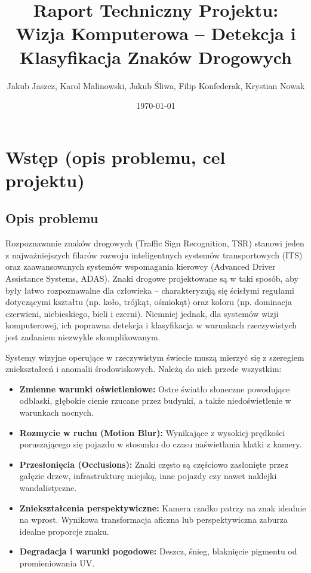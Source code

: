 \documentclass[12pt,a4paper]{article}
\title{\Huge Raport Techniczny Projektu:\\ \Large Wizja Komputerowa -- Detekcja i Klasyfikacja Znaków Drogowych}
\author{Jakub Jaszcz, Karol Malinowski, Jakub Śliwa, Filip Konfederak, Krystian Nowak}
\date{\today}
\begin{document}
\maketitle
\thispagestyle{empty}
\newpage

\tableofcontents
\newpage

\section{Wstęp (opis problemu, cel projektu)}

\subsection{Opis problemu}
Rozpoznawanie znaków drogowych (Traffic Sign Recognition, TSR) stanowi jeden z najważniejszych filarów rozwoju inteligentnych systemów transportowych (ITS) oraz zaawansowanych systemów wspomagania kierowcy (Advanced Driver Assistance Systems, ADAS). Znaki drogowe projektowane są w taki sposób, aby były łatwo rozpoznawalne dla człowieka -- charakteryzują się ścisłymi regułami dotyczącymi kształtu (np. koło, trójkąt, ośmiokąt) oraz koloru (np. dominacja czerwieni, niebieskiego, bieli i czerni). Niemniej jednak, dla systemów wizji komputerowej, ich poprawna detekcja i klasyfikacja w warunkach rzeczywistych jest zadaniem niezwykle skomplikowanym.

Systemy wizyjne operujące w rzeczywistym świecie muszą mierzyć się z szeregiem zniekształceń i anomalii środowiskowych. Należą do nich przede wszystkim:
\begin{itemize}
    \item \textbf{Zmienne warunki oświetleniowe:} Ostre światło słoneczne powodujące odblaski, głębokie cienie rzucane przez budynki, a także niedoświetlenie w warunkach nocnych.
    \item \textbf{Rozmycie w ruchu (Motion Blur):} Wynikające z wysokiej prędkości poruszającego się pojazdu w stosunku do czasu naświetlania klatki z kamery.
    \item \textbf{Przesłonięcia (Occlusions):} Znaki często są częściowo zasłonięte przez gałęzie drzew, infrastrukturę miejską, inne pojazdy czy nawet naklejki wandalistyczne.
    \item \textbf{Zniekształcenia perspektywiczne:} Kamera rzadko patrzy na znak idealnie na wprost. Wynikowa transformacja aficzna lub perspektywiczna zaburza idealne proporcje znaku.
    \item \textbf{Degradacja i warunki pogodowe:} Deszcz, śnieg, blaknięcie pigmentu od promieniowania UV.
\end{itemize}
\end{document}
